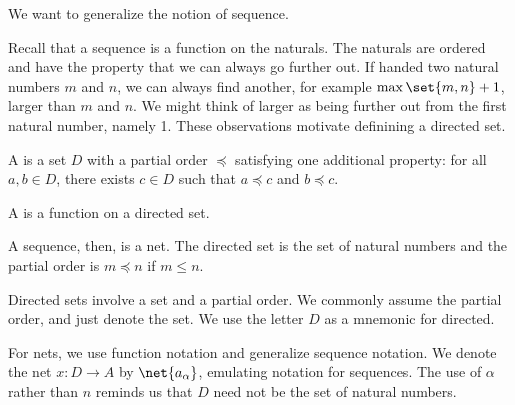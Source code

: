 
\sbasic




\sstart


We want to generalize the notion of sequence.



Recall that a sequence is a function on the naturals.
The naturals are ordered and have the property that we can always go further out.
If handed two natural numbers $m$ and $n$, we can always find another, for example $\max\set{m,n}+1$, larger than $m$ and $n$.
We might think of larger as being further out from the first natural number, namely 1.
These observations motivate definining a directed set.

\begin{defn}
A  is a set $D$ with a partial order $\preceq$ satisfying one additional property: for all $a, b \in D$, there exists $c \in D$ such that $a \preceq c$ and $b \preceq c$.
\end{defn}

\begin{defn}
A  is a function on a directed set.
\end{defn}

A sequence, then, is a net.
The directed set is the set of natural numbers and the partial order is $m \preceq n$ if $m \leq n$.


Directed sets involve a set and a partial order.
We commonly assume the partial order, and just denote the set.
We use the letter $D$ as a mnemonic for directed.

For nets, we use function notation and generalize sequence notation.
We denote the net $x: D \to A$ by $\net{a_{\alpha}}$, emulating notation for sequences.
The use of $\alpha$ rather than $n$ reminds us that $D$ need not be the set of natural numbers.

\strats
